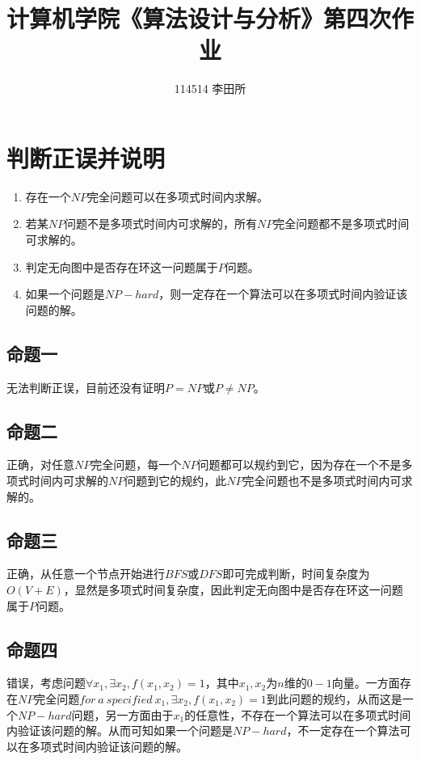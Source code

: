 \documentclass{article}
\title{\heiti 计算机学院《算法设计与分析》第四次作业}
\author{114514 李田所}
\begin{document}
\maketitle

\section{判断正误并说明}

\begin{enumerate}[itemindent=3em]
    \item{存在一个$NP$完全问题可以在多项式时间内求解。}
    \item{若某$NP$问题不是多项式时间内可求解的，所有$NP$完全问题都不是多项式时间可求解的。}
    \item{判定无向图中是否存在环这一问题属于$P$问题。}
    \item{如果一个问题是$NP-hard$，则一定存在一个算法可以在多项式时间内验证该问题的解。}
\end{enumerate}

\subsection{命题一}

无法判断正误，目前还没有证明$P=NP$或$P\ne{NP}$。

\subsection{命题二}

正确，对任意$NP$完全问题，每一个$NP$问题都可以规约到它，因为存在一个不是多项式时间内可求解的$NP$问题到它的规约，此$NP$完全问题也不是多项式时间内可求解的。

\subsection{命题三}

正确，从任意一个节点开始进行$BFS$或$DFS$即可完成判断，时间复杂度为$O(V+E)$，显然是多项式时间复杂度，因此判定无向图中是否存在环这一问题属于$P$问题。

\subsection{命题四}

错误，考虑问题$\forall{x_1},\exists{x_2},f(x_1,x_2)=1$，其中$x_1,x_2$为$n$维的$0-1$向量。一方面存在$NP$完全问题$for\ a\ specified \ x_1,\exists{x_2},f(x_1,x_2)=1$到此问题的规约，从而这是一个$NP-hard$问题，另一方面由于$x_1$的任意性，不存在一个算法可以在多项式时间内验证该问题的解。从而可知如果一个问题是$NP-hard$，不一定存在一个算法可以在多项式时间内验证该问题的解。
\end{document}

